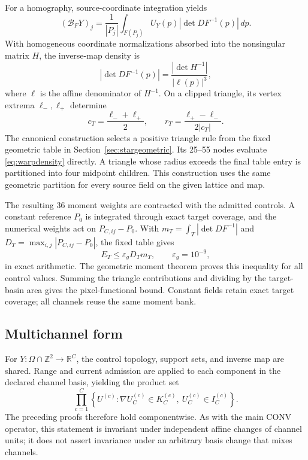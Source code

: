 \documentclass[journal]{IEEEtran}
\newcommand{\R}{\mathbb{R}}
\begin{document}
For a homography, source-coordinate integration yields
\begin{equation}
 (\mathcal B_FY)_j=\frac1{|P_j|}
 \int_{F(P_j)}U_Y(p)\left|\det DF^{-1}(p)\right|\,dp.
 \label{eq:warpprojectiveintegral}
\end{equation}
With homogeneous coordinate normalizations absorbed into the nonsingular
matrix \(H\), the inverse-map density is
\begin{equation}
 \left|\det DF^{-1}(p)\right|
 =\frac{|\det H^{-1}|}{|\ell(p)|^3},
 \label{eq:warpdensity}
\end{equation}
where \(\ell\) is the affine denominator of \(H^{-1}\). On a clipped
triangle, its vertex extrema \(\ell_-,\ell_+\) determine
\begin{equation}
 c_T=\frac{\ell_-+\ell_+}{2},\qquad
 r_T=\frac{\ell_+-\ell_-}{2|c_T|}.
\end{equation}
The canonical construction selects a positive triangle rule from the fixed
geometric table in Section~\ref{sec:stargeometric}. Its 25--55 nodes evaluate
\eqref{eq:warpdensity} directly. A triangle whose radius exceeds the final
table entry is partitioned into four midpoint children. This construction
uses the same geometric partition for every source field on the given
lattice and map.

The resulting 36 moment weights are contracted with the admitted controls.
A constant reference \(P_0\) is integrated through exact target coverage,
and the numerical weights act on \(P_{C,ij}-P_0\). With
\(m_T=\int_T|\det DF^{-1}|\) and
\(D_T=\max_{i,j}|P_{C,ij}-P_0|\), the fixed table gives
\begin{equation}
 E_T\leq \varepsilon_gD_Tm_T,\qquad \varepsilon_g=10^{-9},
 \label{eq:warpprojectivecertificate}
\end{equation}
in exact arithmetic. The geometric moment theorem proves this inequality
for all control values. Summing the triangle contributions and dividing by
the target-basin area gives the pixel-functional bound. Constant fields
retain exact target coverage; all channels reuse the same moment bank.

\subsection{Multichannel form}

For \(Y:\Omega\cap\mathbb Z^2\to\R^C\), the control topology, support sets,
and inverse map are shared.  Range and current admission are applied to each
component in the declared channel basis, yielding the product set
\begin{equation}
 \prod_{c=1}^C
 \left\{U^{(c)}:\nabla U_C^{(c)}\in K_C^{(c)},\ 
 U_C^{(c)}\in I_C^{(c)}\right\}.
 \label{eq:warpmultichannel}
\end{equation}
The preceding proofs therefore hold componentwise.  As with the main CONV
operator, this statement is invariant under independent affine changes of
channel units; it does not assert invariance under an arbitrary basis change
that mixes channels.
\end{document}
